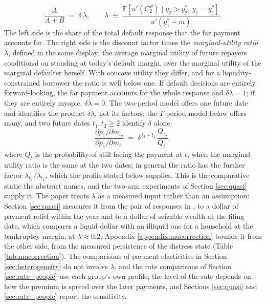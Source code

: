 \begin{equation}\label{eq:twoperiod}
\frac{A}{A + B} \;=\; \delta\,\lambda, \qquad
\lambda \;\equiv\; \frac{\mathbb{E}\left[u'(C_2^P) \mid y_2 > y_2^*,\, y_1 = y_1^*\right]}{u'(y_1^* - m)}.
\end{equation}
The left side is the share of the total default response that the far payment accounts for. The right side is the discount factor times the \emph{marginal-utility ratio} $\lambda$, defined in the same display: the average marginal utility of future repayers conditional on standing at today's default margin, over the marginal utility of the marginal defaulter herself. With concave utility they differ, and for a liquidity-constrained borrower the ratio is well below one. If default decisions are entirely forward-looking, the far payment accounts for the whole response and $\delta\lambda = 1$; if they are entirely myopic, $\delta\lambda = 0$. The two-period model offers one future date and identifies the product $\delta\lambda$, not its factors; the $T$-period model below offers many, and two future dates $t_1, t_2 \ge 2$ identify $\delta$ alone:
\begin{equation}\label{eq:twofuture}
\frac{\partial p_1/\partial m_{t_2}}{\partial p_1/\partial m_{t_1}} \;=\; \delta^{\,t_2 - t_1}\,\frac{Q_{t_2}}{Q_{t_1}},
\end{equation}
where $Q_t$ is the probability of still facing the payment at $t$, when the marginal-utility ratio is the same at the two dates; in general the ratio has the further factor $\lambda_{t_2}/\lambda_{t_1}$, which the profile stated below supplies. This is the comparative static the abstract names, and the two-arm experiments of Section \ref{sec:quasi} supply it. The paper treats $\lambda$ as a measured input rather than an assumption: Section \ref{sec:quasi} measures it from the pair of responses in \citet{indarte_moral_2023}, to a dollar of payment relief within the year and to a dollar of seizable wealth at the filing date, which compares a liquid dollar with an illiquid one for a household at the bankruptcy margin, at $\lambda \approx 0.2$; Appendix \ref{appendix:mucorrection} bounds it from the other side, from the measured persistence of the distress state (Table \ref{tab:mucorrection}). The comparisons of payment elasticities in Section \ref{sec:heterogeneity} do not involve $\lambda$, and the rate comparisons of Section \ref{sec:rate_people} use each group's own profile; the level of the rate depends on how the premium is spread over the later payments, and Sections \ref{sec:quasi} and \ref{sec:rate_people} report the sensitivity.


